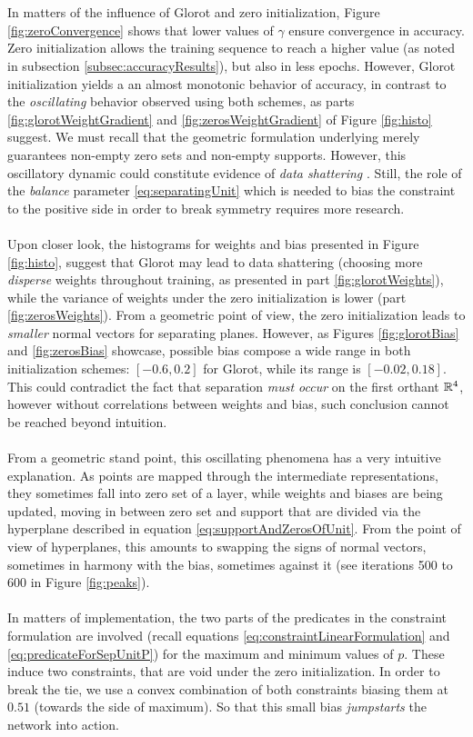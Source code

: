 \\\\
In matters of the influence of Glorot and zero initialization, Figure \ref{fig:zeroConvergence} shows that lower values of $\gamma$ ensure convergence in accuracy. Zero initialization allows the training sequence to reach a higher value (as noted in subsection \ref{subsec:accuracyResults}), but also in less epochs. However, Glorot initialization yields a an almost monotonic behavior of accuracy, in contrast to the \emph{oscillating} behavior observed using both schemes, as parts \ref{fig:glorotWeightGradient} and \ref{fig:zerosWeightGradient} of Figure \ref{fig:histo} suggest. We must recall that the geometric formulation underlying \SepUnit merely guarantees non-empty zero sets and non-empty supports. However, this oscillatory dynamic could constitute evidence of \emph{data shattering} \cite{Zhang2016RethinkingGeneralization}. Still, the role of the \emph{balance} parameter \ref{eq:separatingUnit} which is needed to bias the constraint to the positive side in order to break symmetry requires more research.
\\\\
Upon closer look, the histograms for weights and bias presented in Figure \ref{fig:histo}, suggest that Glorot may lead to data shattering (choosing more \emph{disperse} weights throughout training, as presented in part \ref{fig:glorotWeights}), while the variance of weights under the zero initialization is lower (part \ref{fig:zerosWeights}). From a geometric point of view, the zero initialization leads to \emph{smaller} normal vectors for separating planes. However, as Figures \ref{fig:glorotBias} and \ref{fig:zerosBias} showcase, possible bias  compose a wide range in both initialization schemes: $[-0.6,0.2]$ for Glorot, while its range is $[-0.02,0.18]$. This could contradict the fact that separation \emph{must occur} on the first orthant $\mathbb{R}^{4}$, however without correlations between weights and bias, such conclusion cannot be reached beyond intuition.    
\\\\
From a geometric stand point, this oscillating phenomena has a very intuitive explanation. As points are mapped through the intermediate representations, they sometimes fall into zero set of a layer, while weights and biases are being updated, moving in between zero set and support that are divided via the hyperplane described in equation \ref{eq:supportAndZerosOfUnit}. From the point of view of hyperplanes, this amounts to swapping the signs of normal vectors, sometimes in harmony with the bias, sometimes against it (see iterations 500 to 600 in Figure \ref{fig:peaks}). 
\\\\
In matters of implementation, the two parts of the predicates in the constraint formulation are involved (recall equations \ref{eq:constraintLinearFormulation} and \ref{eq:predicateForSepUnitP}) for the maximum and minimum values of $p$. These induce two constraints, that are void under the zero initialization.  In order to break the tie, we use a convex combination of both constraints biasing them at $0.51$ (towards the side of maximum). So that this small bias \emph{jumpstarts} the network into action.  

